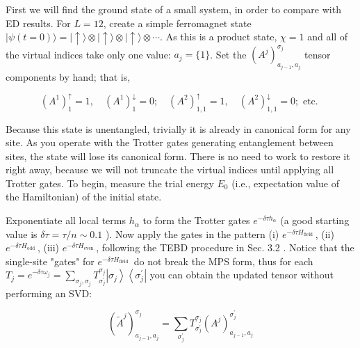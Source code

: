 \documentclass[12pt]{article}
\begin{document}
First we will find the ground state of a small system, in order to compare with ED results. For $L=12$, create a simple ferromagnet state $|\psi(t=0)\rangle=|\uparrow\rangle \otimes|\uparrow\rangle \otimes|\uparrow\rangle \otimes \cdots$. As this is a product state, $\chi=1$ and all of the virtual indices take only one value: $a_{j}=\{1\}$. Set the $\left(A^{j}\right)_{a_{j-1}, a_{j}}^{\sigma_{j}}$ tensor components by hand; that is,


\begin{equation*}
\left(A^{1}\right)_{1}^{\uparrow}=1, \quad\left(A^{1}\right)_{1}^{\downarrow}=0 ; \quad\left(A^{2}\right)_{1,1}^{\uparrow}=1, \quad\left(A^{2}\right)_{1,1}^{\downarrow}=0 ; \text { etc. } \tag{21}
\end{equation*}


Because this state is unentangled, trivially it is already in canonical form for any site. As you operate with the Trotter gates generating entanglement between sites, the state will lose its canonical form. There is no need to work to restore it right away, because we will not truncate the virtual indices until applying all Trotter gates. To begin, measure the trial energy $E_{0}$ (i.e., expectation value of the Hamiltonian) of the initial state.

Exponentiate all local terms $h_{\alpha}$ to form the Trotter gates $e^{-\delta \tau h_{\alpha}}$ (a good starting value is $\delta \tau=\tau / n \sim 0.1$ ). Now apply the gates in the pattern (i) $e^{-\delta \tau H_{\text {field }}}$, (ii) $e^{-\delta \tau H_{\text {odd }}}$, (iii) $e^{-\delta \tau H_{\text {even }}}$, following the TEBD procedure in Sec. 3.2 . Notice that the single-site "gates" for $e^{-\delta \tau H_{\text {field }}}$ do not break the MPS form, thus for each $T_{j}=e^{-\delta \tau \omega_{j}}=\sum_{\sigma_{j}, \sigma_{j}} T_{\sigma_{j}^{\prime}}^{\sigma_{j}}\left|\sigma_{j}\right\rangle\left\langle\sigma_{j}^{\prime}\right|$ you can obtain the updated tensor without performing an SVD:


\begin{equation*}
\left(\tilde{A}^{j}\right)_{a_{j-1}, a_{j}}^{\sigma_{j}}=\sum_{\sigma_{j}^{\prime}} T_{\sigma_{j}^{\prime}}^{\sigma_{j}}\left(A^{j}\right)_{a_{j-1}, a_{j}}^{\sigma_{j}^{\prime}} \tag{22}
\end{equation*}
\end{document}
